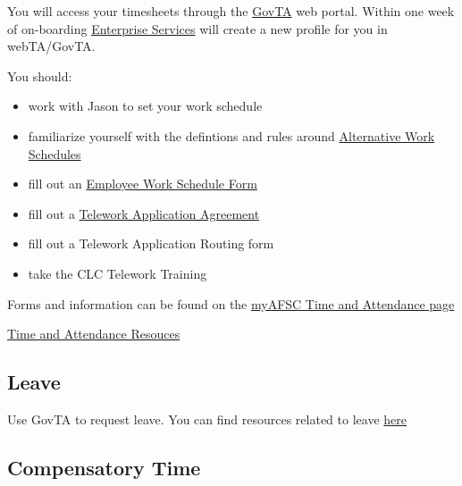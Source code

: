 \documentclass[
  letterpaper,
  DIV=11,
  numbers=noendperiod]{scrreprt}
\providecommand{\tightlist}{%
  \setlength{\itemsep}{0pt}\setlength{\parskip}{0pt}}\usepackage{longtable,booktabs,array}
\begin{document}
You will access your timesheets through the
\href{https://docwebta.eas.commerce.gov/webta/}{GovTA} web portal.
Within one week of on-boarding
\href{https://enterpriseservices.servicenowservices.com/es}{Enterprise
Services} will create a new profile for you in webTA/GovTA.

You should:

\begin{itemize}
\tightlist
\item
  work with Jason to set your work schedule\\
\item
  familiarize yourself with the defintions and rules around
  \href{https://drive.google.com/file/d/1VlxkCEHZEdQd2pfGu9Bud5QZDUudqioa/view?pli=1}{Alternative
  Work Schedules}\\
\item
  fill out an
  \href{https://drive.google.com/file/d/1SvyTE2M6lQ0dcX5w3b0f7CJNxU6zDFDy/view?usp=share_link}{Employee
  Work Schedule Form}\\
\item
  fill out a
  \href{https://drive.google.com/file/d/19oABvmjMgRX4az-9U1Ijgd3ux5BwmHQw/view}{Telework
  Application Agreement}\\
\item
  fill out a Telework Application Routing form
\item
  take the CLC Telework Training
\end{itemize}

Forms and information can be found on the
\href{https://sites.google.com/noaa.gov/myafsc/administrative/time-and-attendance}{myAFSC
Time and Attendance page}

\href{https://sites.google.com/noaa.gov/myafsc/administrative/time-and-attendance}{Time
and Attendance Resouces}

\hypertarget{leave}{%
\subsection{Leave}\label{leave}}

Use GovTA to request leave. You can find resources related to leave
\href{https://sites.google.com/noaa.gov/myafsc/administrative/time-and-attendance}{here}

\hypertarget{compensatory-time}{%
\subsection{Compensatory Time}\label{compensatory-time}}
\end{document}
